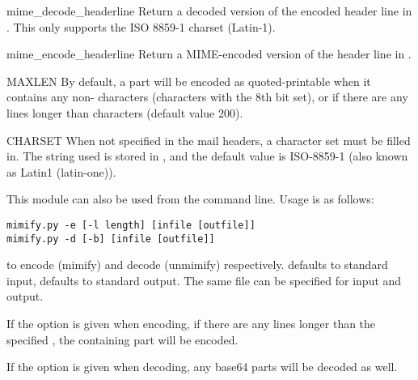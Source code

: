 \begin{funcdesc}{mime_decode_header}{line}
Return a decoded version of the encoded header line in .
This only supports the ISO 8859-1 charset (Latin-1).
\end{funcdesc}

\begin{funcdesc}{mime_encode_header}{line}
Return a MIME-encoded version of the header line in .
\end{funcdesc}

\begin{datadesc}{MAXLEN}
By default, a part will be encoded as quoted-printable when it
contains any non-\ASCII{} characters (characters with the 8th bit
set), or if there are any lines longer than  characters
(default value 200).  
\end{datadesc}

\begin{datadesc}{CHARSET}
When not specified in the mail headers, a character set must be filled
in.  The string used is stored in , and the default
value is ISO-8859-1 (also known as Latin1 (latin-one)).
\end{datadesc}

This module can also be used from the command line.  Usage is as
follows:
\begin{verbatim}
mimify.py -e [-l length] [infile [outfile]]
mimify.py -d [-b] [infile [outfile]]
\end{verbatim}
to encode (mimify) and decode (unmimify) respectively.  
defaults to standard input,  defaults to standard output.
The same file can be specified for input and output.

If the  option is given when encoding, if there are any lines
longer than the specified , the containing part will be
encoded.

If the  option is given when decoding, any base64 parts will
be decoded as well.

\begin{seealso}
\end{seealso}
